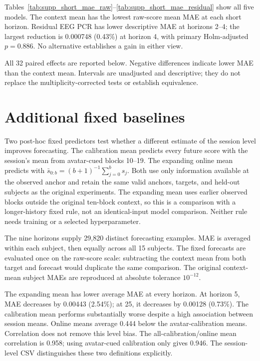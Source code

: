 \documentclass[a4paper,10pt,onecolumn]{IEEEtran}
\begin{document}
Tables~\ref{tab:supp_short_mae_raw}--\ref{tab:supp_short_mae_residual} show
all five models. The context mean has the lowest raw-score mean MAE at each
short horizon. Residual EEG PCR has lower descriptive MAE at horizons 2--4;
the largest reduction is 0.000748 (0.43\%) at horizon 4, with primary
Holm-adjusted $p=0.886$. No alternative establishes a gain in either view.




\clearpage
All 32 paired effects are reported below. Negative differences indicate lower
MAE than the context mean. Intervals are unadjusted and descriptive; they do
not replace the multiplicity-corrected tests or establish equivalence.




\clearpage
\section{Additional fixed baselines}\label{sec:supp_additional_baselines}

Two post-hoc fixed predictors test whether a different estimate of the
session level improves forecasting. The calibration mean predicts every
future score with the session's mean from avatar-cued blocks 10--19.
The expanding online mean predicts with
$\bar s_{0:b}=(b+1)^{-1}\sum_{j=0}^{b}s_j$.
Both use only information available at the observed anchor and retain
the same valid anchors, targets, and held-out subjects as the original
experiments. The expanding mean uses earlier observed blocks outside the
original ten-block context, so this is a comparison with a longer-history
fixed rule, not an identical-input model comparison. Neither rule needs
training or a selected hyperparameter.

The nine horizons supply 29,820 distinct forecasting examples.
MAE is averaged within each subject, then equally across all 15 subjects.
The fixed forecasts are evaluated once on the raw-score scale: subtracting
the context mean from both target and forecast would duplicate the same
comparison. The original context-mean subject MAEs are reproduced at
absolute tolerance $10^{-12}$.



The expanding mean has lower average MAE at every horizon. At horizon 5,
MAE decreases by 0.00443 (2.54\%); at 25, it decreases by 0.00128 (0.73\%).
The calibration mean performs substantially worse despite a high association
between session means. Online means average 0.444 below the avatar-calibration
means. Correlation does not remove this level bias. The all-calibration/online
mean correlation is 0.958; using avatar-cued calibration only gives 0.946.
The session-level CSV distinguishes these two definitions explicitly.
\end{document}

